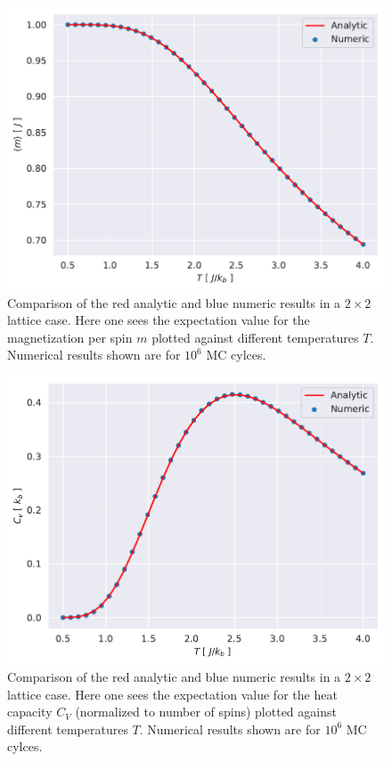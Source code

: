 \documentclass[english,notitlepage,reprint,nofootinbib]{revtex4-1}  %
\begin{document}
\begin{figure}[H]
    \centering
    \includegraphics[width=.5\textwidth]{../figures/numeric_analytic_m_T.pdf}
    \caption{Comparison of the red analytic and blue numeric results in a $2\times2$ lattice case. Here one sees the expectation value for the magnetization per spin $m$ plotted against different temperatures $T$. Numerical results shown are for $10^6$ MC cylces.}
    \label{fig:numeric_analytic_m_T}
\end{figure}

\begin{figure}[H]
    \centering
    \includegraphics[width=.5\textwidth]{../figures/numeric_analytic_c_v_T.pdf}
    \caption{Comparison of the red analytic and blue numeric results in a $2\times2$ lattice case. Here one sees the expectation value for the heat capacity $C_V$ (normalized to number of spins) plotted against different temperatures $T$. Numerical results shown are for $10^6$ MC cylces.}
    \label{fig:numeric_analytic_c_v_T}
\end{figure}
\end{document}
